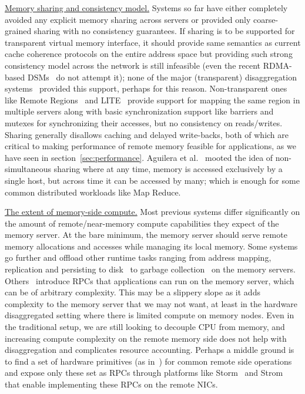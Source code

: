 \vspace{3pt}
\noindent \uline{Memory sharing and consistency model.}
Systems so far have either completely avoided any explicit 
memory sharing across servers or provided only coarse-grained 
sharing with no consistency guarantees. 
If sharing is to be supported for transparent virtual 
memory interface, it should provide same semantics as current 
cache coherence protocols on the entire address space but 
providing such strong consistency model across the network 
is still infeasible (even the recent RDMA-based DSMs~\cite{farm,gam} 
do not attempt it); none of the major (transparent) 
disaggregation systems~\cite{infiniswap,legoos} provided this 
support, perhaps for this reason. Non-transparent ones like 
Remote Regions~\cite{remregions} and LITE~\cite{literdma} provide
support for mapping the same region in multiple servers along with
basic synchronization support like barriers and mutexes for 
synchronizing their accesses, but no consistency on reads/writes. 
Sharing generally disallows caching and delayed write-backs,
both of which are critical to making performance of remote memory 
feasible for applications, as we have seen in 
section~\ref{sec:performance}. Aguilera et al.~\cite{Aguilera2017}
mooted the idea of non-simultaneous sharing where at any time, 
memory is accessed exclusively by a single host, but across 
time it can be accessed by many; which is enough for some common 
distributed workloads like Map Reduce.


\vspace{3pt}
\noindent \uline{The extent of memory-side compute.}
Most previous systems differ significantly on the 
amount of remote/near-memory compute capabilities they expect 
of the memory server. At the bare minimum, the memory server 
should serve remote memory allocations and accesses while 
managing its local memory. Some systems go further and offload 
other runtime tasks ranging from address mapping, replication and 
persisting to disk~\cite{legoos} to garbage collection~\cite{semeru} 
on the memory servers. Others~\cite{aifm,literdma} introduce 
RPCs that applications can run on the memory server, which can 
be of arbitrary complexity. This may be a slippery slope as it adds 
complexity to the memory server that we may not want, at least in 
the hardware disaggregated setting where there is limited compute 
on memory nodes. Even in the traditional setup, we are still 
looking to decouple CPU from memory, and  increasing compute 
complexity on the remote memory side does not help with 
disaggregation and complicates resource accounting. 
Perhaps a middle ground is to find a set of hardware primitives 
(as in~\cite{Aguilera2019}) for common remote side operations and 
expose only these set as RPCs through platforms like 
Storm~\cite{storm} and Strom~\cite{strom} that enable  
implementing these RPCs on the remote NICs. 


